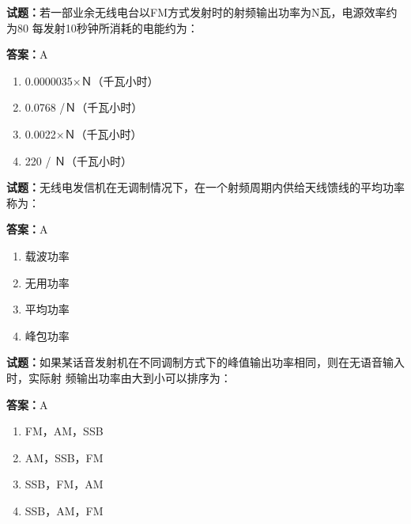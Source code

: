 \documentclass{ctexbook}
\begin{document}




\vspace{1em}

\textbf{试题：}若一部业余无线电台以FM方式发射时的射频输出功率为N瓦，电源效率约为80%
每发射10秒钟所消耗的电能约为： 

\textbf{答案：}A 

\begin{enumerate}[leftmargin=3em]
  \item 0.0000035×Ｎ（千瓦小时） 

  \item 0.0768 /Ｎ（千瓦小时） 

  \item 0.0022×Ｎ（千瓦小时） 

  \item 220 / Ｎ（千瓦小时） 

\end{enumerate}





\vspace{1em}

\textbf{试题：}无线电发信机在无调制情况下，在一个射频周期内供给天线馈线的平均功率称为： 

\textbf{答案：}A 

\begin{enumerate}[leftmargin=3em]
  \item 载波功率 

  \item 无用功率 

  \item 平均功率 

  \item 峰包功率 

\end{enumerate}





\vspace{1em}

\textbf{试题：}如果某话音发射机在不同调制方式下的峰值输出功率相同，则在无语音输入时，实际射
频输出功率由大到小可以排序为： 

\textbf{答案：}A 

\begin{enumerate}[leftmargin=3em]
  \item FM，AM，SSB 

  \item AM，SSB，FM 

  \item SSB，FM，AM 

  \item SSB，AM，FM 

\end{enumerate}
\end{document}
